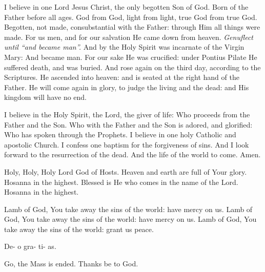 \documentclass[11pt]{article} %
\begin{document}
I believe in one Lord Jesus Christ, the only begotten Son of God.  Born of the Father before all ages.  God from God, light from light, true God from true God.  Begotten, not made, consubstantial with the Father: through Him all things were made.  For us men, and for our salvation He came down from heaven. \emph{Genuflect until ``and became man''.}  And by the Holy Spirit was incarnate of the Virgin Mary:  And became man.  For our sake He was crucified: under Pontius Pilate He suffered death, and was buried.  And rose again on the third day, according to the Scriptures.  He ascended into heaven: and is seated at the right hand of the Father.  He will come again in glory, to judge the living and the dead: and His kingdom will have no end.

I believe in the Holy Spirit, the Lord, the giver of life:  Who proceeds from the Father and the Son.  Who with the Father and the Son is adored, and glorified:  Who has spoken through the Prophets.  I believe in one holy Catholic and apostolic Church.  I confess one baptism for the forgiveness of sins.  And I look forward to the resurrection of the dead.  And the life of the world to come.  Amen.

\vskip20pt

Holy, Holy, Holy Lord God of Hosts.  Heaven and earth are full of Your glory.  Hosanna in the highest.  Blessed is He who comes in the name of the Lord.  Hosanna in the highest.

\vskip20pt

Lamb of God, You take away the sins of the world: have mercy on us.  Lamb of God, You take away the sins of the world: have mercy on us.  Lamb of God, You take away the sins of the world: grant us peace.

\vskip20pt

\hspace{12.7pt} De-\hspace{7.2pt} o\hspace{50.2pt} gra-\hspace{3.7pt} ti-\hspace{0.7pt} as.

Go, the Mass is ended.  Thanks be to God.
\end{document}
